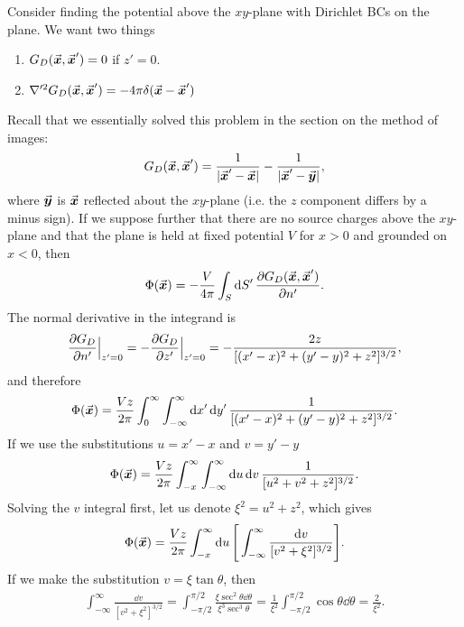 Consider finding the potential above the $xy$-plane with Dirichlet BCs on the plane.
We want two things
\begin{enumerate}
    \item $G_{D}(\va*{x},\va*{x}') = 0$ if $z' = 0$.
    \item $\nabla'^2 G_{D}(\va*{x},\va*{x}') = - 4 \pi \delta(\va*{x} - \va*{x}')$
\end{enumerate}
Recall that we essentially solved this problem in the section on the method of images:
\begin{eqnarray}
    G_{D}(\va*{x},\va*{x}') = \frac{1}{|\va*{x}' - \va*{x}|} - \frac{1}{|\va*{x}' - \va*{y}|}
,\end{eqnarray}
where $\va*{y}$ is $\va*{x}$ reflected about the $xy$-plane (i.e. the $z$ component differs by a minus sign).
If we suppose further that there are no source charges above the $xy$-plane and that the plane is held at fixed potential $V$ for $x > 0$ and grounded on $x < 0$, then 
\begin{eqnarray}
    \Phi(\va*{x}) = -\frac{V}{4 \pi} \int_{S} \dd{S'} \pdv{G_{D}(\va*{x},\va*{x}')}{n'}
.\end{eqnarray}
The normal derivative in the integrand is
\begin{align}
    \pdv{G_{D}}{n'}\Big|_{z' = 0} = -\pdv{G_{D}}{z'}\Big|_{z' = 0} = -\frac{2z}{[(x'-x)^2 + (y'-y)^2 + z^2]^{3/2}}
,\end{align}
and therefore
\begin{align}
    \Phi(\va*{x}) = \frac{V z}{2 \pi} \int_{0}^{\infty} \int_{-\infty}^{\infty} \dd{x'} \dd{y'} \frac{1}{[(x'-x)^2 + (y'-y)^2 + z^2]^{3/2}}
.\end{align}
If we use the substitutions $u = x' - x$ and $v = y' - y$
\begin{align}
    \label{eq:phi-half-plane}
    \Phi(\va*{x}) = \frac{Vz}{2 \pi} \int_{-x}^{\infty} \int_{-\infty}^{\infty} \dd{u} \dd{v} \frac{1}{[u^2 + v^2 + z^2]^{3/2}}
.\end{align}
Solving the $v$ integral first, let us denote $\xi^2 = u^2 + z^2$, which gives
\begin{eqnarray}
    \Phi(\va*{x}) = \frac{V z}{2 \pi} \int_{-x}^{\infty} \dd{u} \Bigg[ \int_{-\infty}^{\infty} \frac{\dd{v}}{[v^2 + \xi^2]^{3/2}}  \Bigg]
.\end{eqnarray}
If we make the substitution $v = \xi \tan{\theta}$, then
\begin{eqnarray}
    \int_{-\infty}^{\infty} \frac{\dd{v}}{[v^2 + \xi^2]^{3/2}} = \int_{-\pi/2}^{\pi/2} \frac{\xi \sec^2{\theta} \dd{\theta}}{\xi^3 \sec^3{\theta}} = \frac{1}{\xi^2} \int_{-\pi/2}^{\pi/2} \cos{\theta} \dd{\theta} = \frac{2}{\xi^2}
.\end{eqnarray}
